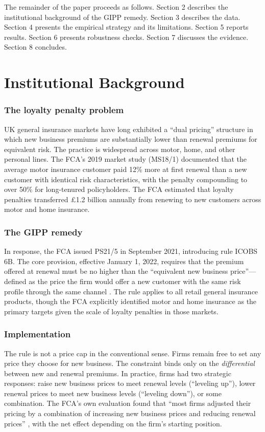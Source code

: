 \documentclass[12pt]{article}
\begin{document}
The remainder of the paper proceeds as follows. Section 2 describes the institutional background of the GIPP remedy. Section 3 describes the data. Section 4 presents the empirical strategy and its limitations. Section 5 reports results. Section 6 presents robustness checks. Section 7 discusses the evidence. Section 8 concludes.


\section{Institutional Background}

\subsubsection*{The loyalty penalty problem} UK general insurance markets have long exhibited a ``dual pricing'' structure in which new business premiums are substantially lower than renewal premiums for equivalent risk. The practice is widespread across motor, home, and other personal lines. The FCA's 2019 market study (MS18/1) documented that the average motor insurance customer paid 12\% more at first renewal than a new customer with identical risk characteristics, with the penalty compounding to over 50\% for long-tenured policyholders. The FCA estimated that loyalty penalties transferred \pounds 1.2 billion annually from renewing to new customers across motor and home insurance.

\subsubsection*{The GIPP remedy} In response, the FCA issued PS21/5 in September 2021, introducing rule ICOBS 6B. The core provision, effective January 1, 2022, requires that the premium offered at renewal must be no higher than the ``equivalent new business price''---defined as the price the firm would offer a new customer with the same risk profile through the same channel \citep{fca2021ps}. The rule applies to all retail general insurance products, though the FCA explicitly identified motor and home insurance as the primary targets given the scale of loyalty penalties in those markets.

\subsubsection*{Implementation} The rule is not a price cap in the conventional sense. Firms remain free to set any price they choose for new business. The constraint binds only on the \textit{differential} between new and renewal premiums. In practice, firms had two strategic responses: raise new business prices to meet renewal levels (``leveling up''), lower renewal prices to meet new business levels (``leveling down''), or some combination. The FCA's own evaluation found that ``most firms adjusted their pricing by a combination of increasing new business prices and reducing renewal prices'' \citep{fca2025ep}, with the net effect depending on the firm's starting position.
\end{document}
